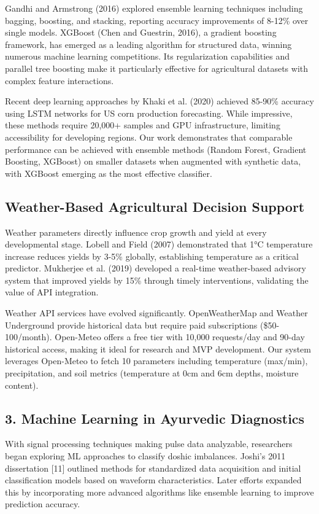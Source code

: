 \documentclass[10pt,twocolumn]{article}
\begin{document}
Gandhi and Armstrong (2016) explored ensemble learning techniques including bagging, boosting, and stacking, reporting accuracy improvements of 8-12\% over single models. XGBoost (Chen and Guestrin, 2016), a gradient boosting framework, has emerged as a leading algorithm for structured data, winning numerous machine learning competitions. Its regularization capabilities and parallel tree boosting make it particularly effective for agricultural datasets with complex feature interactions.

Recent deep learning approaches by Khaki et al. (2020) achieved 85-90\% accuracy using LSTM networks for US corn production forecasting. While impressive, these methods require 20,000+ samples and GPU infrastructure, limiting accessibility for developing regions. Our work demonstrates that comparable performance can be achieved with ensemble methods (Random Forest, Gradient Boosting, XGBoost) on smaller datasets when augmented with synthetic data, with XGBoost emerging as the most effective classifier.

\subsection{Weather-Based Agricultural Decision Support}
Weather parameters directly influence crop growth and yield at every developmental stage. Lobell and Field (2007) demonstrated that 1°C temperature increase reduces yields by 3-5\% globally, establishing temperature as a critical predictor. Mukherjee et al. (2019) developed a real-time weather-based advisory system that improved yields by 15\% through timely interventions, validating the value of API integration.

Weather API services have evolved significantly. OpenWeatherMap and Weather Underground provide historical data but require paid subscriptions (\$50-100/month). Open-Meteo offers a free tier with 10,000 requests/day and 90-day historical access, making it ideal for research and MVP development. Our system leverages Open-Meteo to fetch 10 parameters including temperature (max/min), precipitation, and soil metrics (temperature at 0cm and 6cm depths, moisture content).

\subsection{3. Machine Learning in Ayurvedic Diagnostics}
With signal processing techniques making pulse data analyzable, researchers began exploring ML approaches to classify doshic imbalances. Joshi’s 2011 dissertation [11] outlined methods for standardized data acquisition and initial classification models based on waveform characteristics. Later efforts expanded this by incorporating more advanced algorithms like ensemble learning to improve prediction accuracy.
\end{document}
